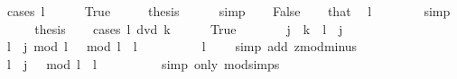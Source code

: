 \begin{isabellebody}
%
\isadelimproof
%
\endisadelimproof
%
\isatagproof
{}\isamarkupfalse%
\ {\isacharparenleft}{\kern0pt}cases\ {\isacartoucheopen}l\ {\isacharequal}{\kern0pt}\ {}{\isacartoucheclose}{\isacharparenright}{\kern0pt}\isanewline
\ \ \isamarkupfalse%
\ True\isanewline
\ \ \isamarkupfalse%
\ \isamarkupfalse%
\ {\isacharquery}{\kern0pt}thesis\isanewline
\ \ \ \ \isamarkupfalse%
\ simp\isanewline
{}\isamarkupfalse%
\isanewline
\ \ \isamarkupfalse%
\ False\isanewline
\ \ \isamarkupfalse%
\ that\ \isamarkupfalse%
\ {\isacartoucheopen}l\ {\isachargreater}{\kern0pt}\ {}{\isacartoucheclose}\isanewline
\ \ \ \ \isamarkupfalse%
\ simp\isanewline
\ \ \isamarkupfalse%
\ \isamarkupfalse%
\ {\isacharquery}{\kern0pt}thesis\isanewline
\ \ \isamarkupfalse%
\ {\isacharparenleft}{\kern0pt}cases\ {\isacartoucheopen}l\ dvd\ k{\isacartoucheclose}{\isacharparenright}{\kern0pt}\isanewline
\ \ \ \ \isamarkupfalse%
\ True\isanewline
\ \ \ \ \isamarkupfalse%
\ \isamarkupfalse%
\ j\ \ {\isacartoucheopen}k\ {\isacharequal}{\kern0pt}\ l\ {\isacharasterisk}{\kern0pt}\ j{\isacartoucheclose}\ \isacommand{{\isachardot}{\kern0pt}{\isachardot}{\kern0pt}}\isamarkupfalse%
\isanewline
\ \ \ \ \isamarkupfalse%
\ \isamarkupfalse%
\ {\isacartoucheopen}{\isacharparenleft}{\kern0pt}l\ {\isacharasterisk}{\kern0pt}\ j\ mod\ l\ {\isacharminus}{\kern0pt}\ {}{\isacharparenright}{\kern0pt}\ mod\ l\ {\isacharequal}{\kern0pt}\ l\ {\isacharminus}{\kern0pt}\ {}{\isacartoucheclose}\isanewline
\ \ \ \ \ \ \isamarkupfalse%
\ {\isacartoucheopen}l\ {\isachargreater}{\kern0pt}\ {}{\isacartoucheclose}\ \isamarkupfalse%
\ {\isacharparenleft}{\kern0pt}simp\ add{\isacharcolon}{\kern0pt}\ zmod{\isacharunderscore}{\kern0pt}minus{}{\isacharparenright}{\kern0pt}\isanewline
\ \ \ \ \isamarkupfalse%
\ \isamarkupfalse%
\ {\isacartoucheopen}{\isacharparenleft}{\kern0pt}l\ {\isacharasterisk}{\kern0pt}\ j\ {\isacharminus}{\kern0pt}\ {}{\isacharparenright}{\kern0pt}\ mod\ l\ {\isacharequal}{\kern0pt}\ l\ {\isacharminus}{\kern0pt}\ {}{\isacartoucheclose}\isanewline
\ \ \ \ \ \ \isamarkupfalse%
\ {\isacharparenleft}{\kern0pt}simp\ only{\isacharcolon}{\kern0pt}\ mod{\isacharunderscore}{\kern0pt}simps{\isacharparenright}{\kern0pt}\isanewline

\end{isabellebody}
